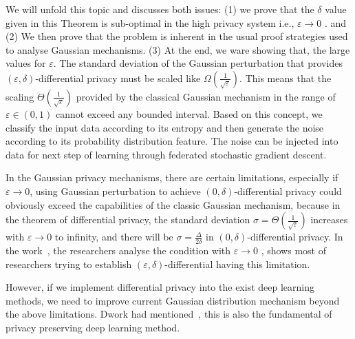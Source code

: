 \documentclass[journal,transmag]{IEEEtran}
\begin{document}
We will unfold this topic and discusses both issues: (1) we prove that the $\delta$ value given in this Theorem is sub-optimal in the high privacy system i.e.,  $\varepsilon \rightarrow 0$ . and (2) We then prove that the problem is inherent in the usual proof strategies used to analyse Gaussian mechanisms. (3) At the end, we ware showing that, the large values for $\varepsilon$. The standard deviation of the Gaussian perturbation that provides $(\varepsilon,\delta)$-differential privacy must be scaled like $\Omega(\frac{1}{\sqrt{\varepsilon}})$. This means that the scaling $\Theta(\frac{1}{\sqrt{\varepsilon}})$ provided by the classical Gaussian mechanism in the range of $\varepsilon \in (0,1)$ cannot exceed any bounded interval. Based on this concept, we classify the input data according to its entropy and then generate the noise according to its probability distribution feature.  The noise can be injected into data for next step of learning through federated stochastic gradient descent. 

In the Gaussian privacy mechanisms, there are certain limitations, especially if $\varepsilon \rightarrow 0$, using Gaussian perturbation to achieve $(0,\delta)$-differential privacy could  obviously exceed the capabilities of the classic Gaussian mechanism, because in the theorem of differential privacy, the standard deviation $\sigma=\Theta(\frac{1}{\sqrt{\varepsilon}})$ increases with $\varepsilon \rightarrow 0$ to infinity, and there will be $\sigma=\frac{\Delta}{2\delta}$  in $(0,\delta)$-differential privacy. In the work~\cite{balle2018improving}, the researchers analyse the condition with $\varepsilon \rightarrow 0$ , shows most of researchers  trying to establish $(\varepsilon,\delta)$-differential having this limitation.

However, if we implement differential privacy into the exist deep learning methods, we need to improve current Gaussian distribution mechanism beyond the above limitations. Dwork had mentioned~\cite{dwork2006our}, this is also the fundamental of privacy preserving deep learning method. 
\end{document}

